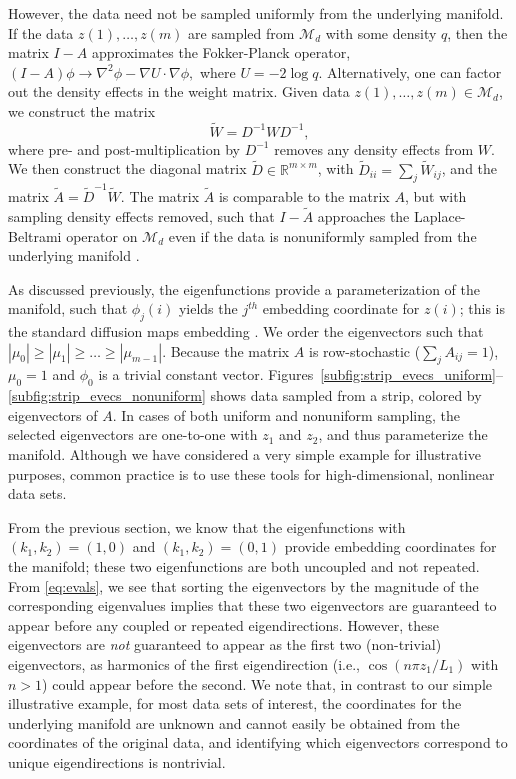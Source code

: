 \documentclass[3p]{elsarticle}
\begin{document}
However, the data need not be sampled uniformly from the underlying manifold.
%
If the data $z(1), \dots, z(m)$ are sampled from $\mathcal{M}_d$ with some density $q$, then the matrix $I-A$ approximates the Fokker-Planck operator, 
$%
(I-A) \phi \rightarrow \nabla^2 \phi - \nabla U \cdot \nabla \phi, 
$ %
where $U = -2 \log q$. 
%
Alternatively, one can factor out the density effects in the weight matrix.
%
Given data $z(1), \dots, z(m) \in \mathcal{M}_d$, we construct the matrix
%
\begin{equation}
\tilde{W} = D^{-1} W D^{-1},
\end{equation}
%
where pre- and post-multiplication by $D^{-1}$ removes any density effects from $W$. 
%
We then construct the diagonal matrix $\tilde{D} \in \mathbb{R}^{m \times m}$, with $\tilde{D}_{ii} = \sum_j \tilde{W}_{ij}$, and the matrix $\tilde{A}  = \tilde{D}^{-1} \tilde{W}.$
%
The matrix $\tilde{A}$ is comparable to the matrix $A$, but with sampling density effects removed, such that $I-\tilde{A}$ approaches the Laplace-Beltrami operator on $\mathcal{M}_d$ even if the data is nonuniformly sampled from the underlying manifold \cite{coifman2005geometric}. 

As discussed previously, the eigenfunctions provide a parameterization of the manifold, such that $\phi_{j}(i)$ yields the $j^{th}$ embedding coordinate for $z(i)$; this is the standard diffusion maps embedding \cite{coifman2005geometric, coifman2006geometric}.
%
We order the eigenvectors such that $|\mu_0| \ge |\mu_1| \ge \dots \ge |\mu_{m-1}|$.
%
Because the matrix $A$ is row-stochastic ($\sum_j A_{ij} = 1$),  $\mu_0 = 1$ and $\phi_0$ is a trivial constant vector.
%
Figures~\ref{subfig:strip_evecs_uniform}--\ref{subfig:strip_evecs_nonuniform} shows data sampled from a strip, colored by eigenvectors of $A$. 
%
In cases of both uniform and nonuniform sampling, the selected eigenvectors are one-to-one with $z_1$ and $z_2$, and thus parameterize the manifold. 
%
Although we have considered a very simple example for illustrative purposes, common practice is to use these tools for high-dimensional, nonlinear data sets.

From the previous section, we know that the eigenfunctions with $(k_1, k_2) =(1, 0)$ and $(k_1, k_2) =(0, 1)$ provide embedding coordinates for the manifold; these two eigenfunctions are both uncoupled and not repeated.  
%
From \eqref{eq:evals}, we see that sorting the eigenvectors by the magnitude of the corresponding eigenvalues implies that these two eigenvectors are guaranteed to appear before any coupled or repeated eigendirections. 
%
However, these eigenvectors are {\em not} guaranteed to appear as the first two (non-trivial) eigenvectors, as harmonics of the first eigendirection (i.e., $\cos \left( n \pi z_1 / L_1 \right)$ with $n > 1$) could appear before the second.
%
We note that, in contrast to our simple illustrative example, for most data sets of interest, the coordinates for the underlying manifold are unknown and cannot easily be obtained from the coordinates of the original data, and identifying which eigenvectors correspond to unique eigendirections is nontrivial.
\end{document}
